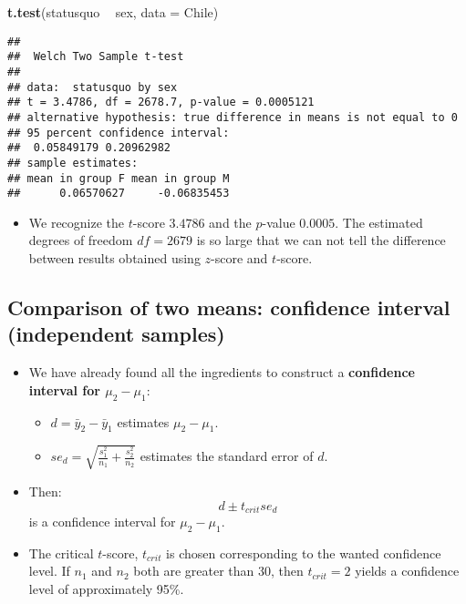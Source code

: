 \documentclass[]{article}
\newenvironment{Shaded}{\begin{snugshade}}{\end{snugshade}}
\newcommand{\KeywordTok}[1]{\textcolor[rgb]{0.13,0.29,0.53}{\textbf{#1}}}
\newcommand{\DataTypeTok}[1]{\textcolor[rgb]{0.13,0.29,0.53}{#1}}
\newcommand{\StringTok}[1]{\textcolor[rgb]{0.31,0.60,0.02}{#1}}
\newcommand{\OperatorTok}[1]{\textcolor[rgb]{0.81,0.36,0.00}{\textbf{#1}}}
\newcommand{\NormalTok}[1]{#1}
\providecommand{\tightlist}{%
  \setlength{\itemsep}{0pt}\setlength{\parskip}{0pt}}
\begin{document}
\begin{Shaded}
\begin{Highlighting}[]
\KeywordTok{t.test}\NormalTok{(statusquo }\OperatorTok{~}\StringTok{ }\NormalTok{sex, }\DataTypeTok{data =}\NormalTok{ Chile)}
\end{Highlighting}
\end{Shaded}

\begin{verbatim}
## 
##  Welch Two Sample t-test
## 
## data:  statusquo by sex
## t = 3.4786, df = 2678.7, p-value = 0.0005121
## alternative hypothesis: true difference in means is not equal to 0
## 95 percent confidence interval:
##  0.05849179 0.20962982
## sample estimates:
## mean in group F mean in group M 
##      0.06570627     -0.06835453
\end{verbatim}

\begin{itemize}
\tightlist
\item
  We recognize the \(t\)-score \(3.4786\) and the \(p\)-value
  \(0.0005\). The estimated degrees of freedom \(df = 2679\) is so large
  that we can not tell the difference between results obtained using
  \(z\)-score and \(t\)-score.
\end{itemize}

\subsection{Comparison of two means: confidence interval (independent
samples)}\label{comparison-of-two-means-confidence-interval-independent-samples}

\begin{itemize}
\tightlist
\item
  We have already found all the ingredients to construct a
  \textbf{confidence interval for \(\mu_2-\mu_1\)}:

  \begin{itemize}
  \tightlist
  \item
    \(d=\bar{y}_2-\bar{y}_1\) estimates \(\mu_2-\mu_1\).
  \item
    \(se_d=\sqrt{\frac{s_1^2}{n_1}+\frac{s_2^2}{n_2}}\) estimates the
    standard error of \(d\).
  \end{itemize}
\item
  Then: \[
    d\pm t_{crit}se_d
    \] is a confidence interval for \(\mu_2-\mu_1\).
\item
  The critical \(t\)-score, \(t_{crit}\) is chosen corresponding to the
  wanted confidence level. If \(n_1\) and \(n_2\) both are greater than
  30, then \(t_{crit} = 2\) yields a confidence level of approximately
  95\%.
\end{itemize}
\end{document}
